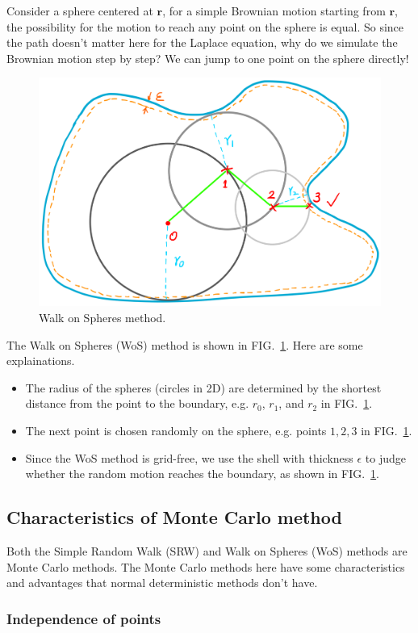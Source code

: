 \documentclass[aps, prl, reprint, groupedaddress]{revtex4-1}
\begin{document}
Consider a sphere centered at $\bm{r}$, for a simple Brownian motion starting from $\bm{r}$, the possibility for the motion to reach any point on the sphere is equal. So since the path doesn't matter here for the Laplace equation, why do we simulate the Brownian motion step by step? We can jump to one point on the sphere directly!

\begin{figure}[htbp]
    \centering
    \includegraphics[width=.46\textwidth]{./figs/wos}
    \caption{\label{fig:wos} Walk on Spheres method.}
\end{figure}

The Walk on Spheres (WoS) method is shown in FIG.~\ref{fig:wos}. Here are some explainations.
\begin{itemize}
    \item The radius of the spheres (circles in 2D) are determined by the shortest distance from the point to the boundary, e.g. $r_0$, $r_1$, and $r_2$ in FIG.~\ref{fig:wos}.
    \item The next point is chosen randomly on the sphere, e.g. points $1, 2, 3$ in FIG.~\ref{fig:wos}.
    \item Since the WoS method is grid-free, we use the shell with thickness $\epsilon$ to judge whether the random motion reaches the boundary, as shown in FIG.~\ref{fig:wos}.
\end{itemize}


\subsection{Characteristics of Monte Carlo method}

Both the Simple Random Walk (SRW) and Walk on Spheres (WoS) methods are Monte Carlo methods. The Monte Carlo methods here have some characteristics and advantages that normal deterministic methods don't have.

\subsubsection{Independence of points}
\end{document}
